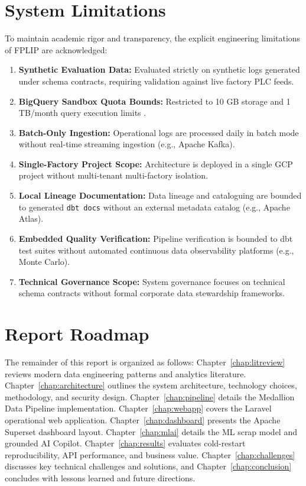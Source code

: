 \documentclass[12pt, a4paper]{report}
\begin{document}
\section{System Limitations}
\label{sec:limitations}
To maintain academic rigor and transparency, the explicit engineering limitations of FPLIP are acknowledged:
\begin{enumerate}
    \item \textbf{Synthetic Evaluation Data:} Evaluated strictly on synthetic logs generated under schema contracts, requiring validation against live factory PLC feeds.
    \item \textbf{BigQuery Sandbox Quota Bounds:} Restricted to 10 GB storage and 1 TB/month query execution limits \cite{google_bq_sandbox}.
    \item \textbf{Batch-Only Ingestion:} Operational logs are processed daily in batch mode without real-time streaming ingestion (e.g., Apache Kafka).
    \item \textbf{Single-Factory Project Scope:} Architecture is deployed in a single GCP project without multi-tenant multi-factory isolation.
    \item \textbf{Local Lineage Documentation:} Data lineage and cataloguing are bounded to generated \texttt{dbt docs} without an external metadata catalog (e.g., Apache Atlas).
    \item \textbf{Embedded Quality Verification:} Pipeline verification is bounded to dbt test suites without automated continuous data observability platforms (e.g., Monte Carlo).
    \item \textbf{Technical Governance Scope:} System governance focuses on technical schema contracts without formal corporate data stewardship frameworks.
\end{enumerate}

\section{Report Roadmap}
The remainder of this report is organized as follows: Chapter~\ref{chap:litreview} reviews modern data engineering patterns and analytics literature. Chapter~\ref{chap:architecture} outlines the system architecture, technology choices, methodology, and security design. Chapter~\ref{chap:pipeline} details the Medallion Data Pipeline implementation. Chapter~\ref{chap:webapp} covers the Laravel operational web application. Chapter~\ref{chap:dashboard} presents the Apache Superset dashboard layout. Chapter~\ref{chap:mlai} details the ML scrap model and grounded AI Copilot. Chapter~\ref{chap:results} evaluates cold-restart reproducibility, API performance, and business value. Chapter~\ref{chap:challenges} discusses key technical challenges and solutions, and Chapter~\ref{chap:conclusion} concludes with lessons learned and future directions.
\end{document}
